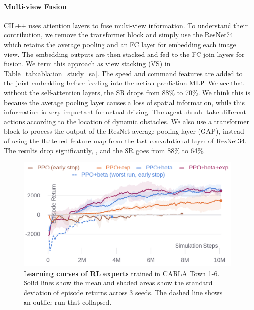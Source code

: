 \paragraph{Multi-view Fusion}
CIL++ uses attention layers to fuse multi-view information. 
To understand their contribution, we remove the transformer block and simply use the ResNet34 which retains the average pooling and an FC layer for embedding each image view. 
The embedding outputs are then stacked and fed to the FC join layers for fusion. 
We term this approach as view stacking (VS) in Table~\ref{tab:ablation_study_sa}. 
The speed and command features are added to the joint embedding before feeding into the action prediction MLP. 
We see that without the self-attention layers, the SR drops from 88\% to 70\%. 
We think this is because the average pooling layer causes a loss of spatial information, while this information is very important for actual driving. 
The agent should take different actions according to the location of dynamic obstacles. 
We also use a transformer block to process the output of the ResNet average pooling layer (GAP), instead of using the flattened feature map from the last convolutional layer of ResNet34. 
The results drop significantly, {\eg}, and the SR goes from 88\% to 64\%.


\begin{figure}[t]
	\begin{center}
		\includegraphics[width=\linewidth]{img/rl.png}
	\end{center}
	\vspace{-4ex}
	\caption{\textbf{Learning curves of RL experts }
		trained in CARLA Town 1-6.
		Solid lines show the mean and shaded areas show the standard deviation of episode returns across 3 seeds.
		The dashed line shows an outlier run that collapsed.}
	\vspace{-2ex}
	\label{fig:rl}
\end{figure}



